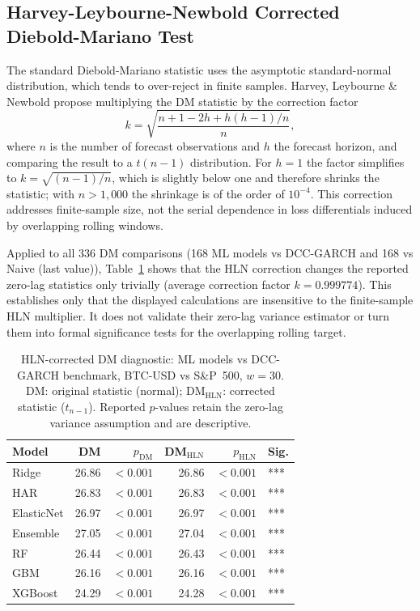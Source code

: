 \subsection{Harvey-Leybourne-Newbold Corrected Diebold-Mariano Test}

The standard Diebold-Mariano statistic uses the asymptotic standard-normal
distribution, which tends to over-reject in finite samples.
Harvey, Leybourne \& Newbold \cite{harvey1997testing} propose multiplying
the DM statistic by the correction factor
\begin{equation}
    k = \sqrt{\frac{n + 1 - 2h + h(h-1)/n}{n}},
\end{equation}
where $n$ is the number of forecast observations and $h$ the forecast horizon,
and comparing the result to a $t(n-1)$ distribution.
For $h = 1$ the factor simplifies to $k = \sqrt{(n-1)/n}$, which is slightly
below one and therefore shrinks the statistic; with $n > 1{,}000$ the shrinkage
is of the order of $10^{-4}$. This correction addresses finite-sample size, not
the serial dependence in loss differentials induced by overlapping rolling windows.

Applied to all 336 DM comparisons (168 ML models vs DCC-GARCH and 168 vs
Naive (last value)), Table~\ref{tab:dm_hln} shows that the HLN correction changes
the reported zero-lag statistics only trivially (average correction factor
$k = 0.999774$). This establishes only that the displayed calculations are
insensitive to the finite-sample HLN multiplier. It does not validate their
zero-lag variance estimator or turn them into formal significance tests for the
overlapping rolling target.

\begin{table}[H]
    \centering
    \caption{HLN-corrected DM diagnostic: ML models vs DCC-GARCH benchmark,
             BTC-USD vs S\&P~500, $w = 30$.
             DM: original statistic (normal); DM$_\text{HLN}$: corrected
             statistic ($t_{n-1}$).
             Reported $p$-values retain the zero-lag variance assumption and are descriptive.}
    \label{tab:dm_hln}
    \begin{tabular}{lrrrrl}
        \toprule
        Model & DM & $p_\text{DM}$ & DM$_\text{HLN}$ & $p_\text{HLN}$ & Sig. \\
        \midrule
        Ridge      & 26.86 & $<0.001$ & 26.86 & $<0.001$ & *** \\
        HAR        & 26.83 & $<0.001$ & 26.83 & $<0.001$ & *** \\
        ElasticNet & 26.97 & $<0.001$ & 26.97 & $<0.001$ & *** \\
        Ensemble   & 27.05 & $<0.001$ & 27.04 & $<0.001$ & *** \\
        RF         & 26.44 & $<0.001$ & 26.43 & $<0.001$ & *** \\
        GBM        & 26.16 & $<0.001$ & 26.16 & $<0.001$ & *** \\
        XGBoost   & 24.29 & $<0.001$ & 24.28 & $<0.001$ & *** \\
        \bottomrule
    \end{tabular}
\end{table}

